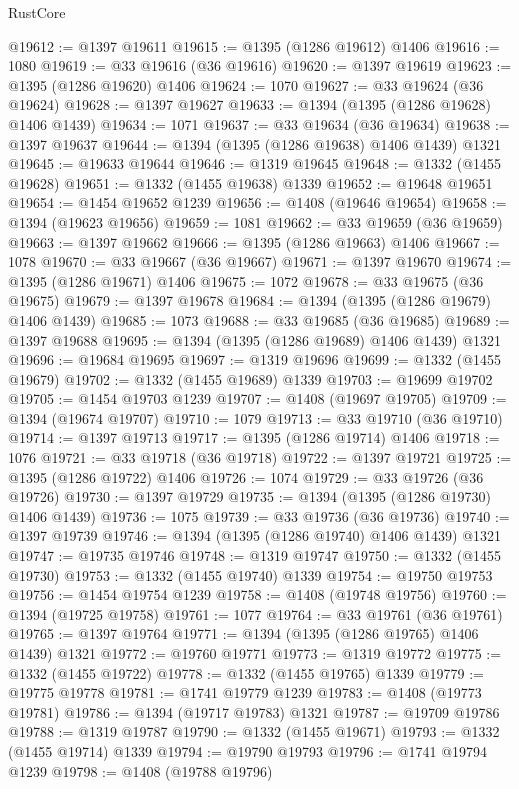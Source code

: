 \begin{lexlean}{RustCore}
\begin{coremodule}
@19612 := @1397 @19611
@19615 := @1395 (@1286 @19612) @1406
@19616 := 1080
@19619 := @33 @19616 (@36 @19616)
@19620 := @1397 @19619
@19623 := @1395 (@1286 @19620) @1406
@19624 := 1070
@19627 := @33 @19624 (@36 @19624)
@19628 := @1397 @19627
@19633 := @1394 (@1395 (@1286 @19628) @1406 @1439)
@19634 := 1071
@19637 := @33 @19634 (@36 @19634)
@19638 := @1397 @19637
@19644 := @1394 (@1395 (@1286 @19638) @1406 @1439) @1321
@19645 := @19633 @19644
@19646 := @1319 @19645
@19648 := @1332 (@1455 @19628)
@19651 := @1332 (@1455 @19638) @1339
@19652 := @19648 @19651
@19654 := @1454 @19652 @1239
@19656 := @1408 (@19646 @19654)
@19658 := @1394 (@19623 @19656)
@19659 := 1081
@19662 := @33 @19659 (@36 @19659)
@19663 := @1397 @19662
@19666 := @1395 (@1286 @19663) @1406
@19667 := 1078
@19670 := @33 @19667 (@36 @19667)
@19671 := @1397 @19670
@19674 := @1395 (@1286 @19671) @1406
@19675 := 1072
@19678 := @33 @19675 (@36 @19675)
@19679 := @1397 @19678
@19684 := @1394 (@1395 (@1286 @19679) @1406 @1439)
@19685 := 1073
@19688 := @33 @19685 (@36 @19685)
@19689 := @1397 @19688
@19695 := @1394 (@1395 (@1286 @19689) @1406 @1439) @1321
@19696 := @19684 @19695
@19697 := @1319 @19696
@19699 := @1332 (@1455 @19679)
@19702 := @1332 (@1455 @19689) @1339
@19703 := @19699 @19702
@19705 := @1454 @19703 @1239
@19707 := @1408 (@19697 @19705)
@19709 := @1394 (@19674 @19707)
@19710 := 1079
@19713 := @33 @19710 (@36 @19710)
@19714 := @1397 @19713
@19717 := @1395 (@1286 @19714) @1406
@19718 := 1076
@19721 := @33 @19718 (@36 @19718)
@19722 := @1397 @19721
@19725 := @1395 (@1286 @19722) @1406
@19726 := 1074
@19729 := @33 @19726 (@36 @19726)
@19730 := @1397 @19729
@19735 := @1394 (@1395 (@1286 @19730) @1406 @1439)
@19736 := 1075
@19739 := @33 @19736 (@36 @19736)
@19740 := @1397 @19739
@19746 := @1394 (@1395 (@1286 @19740) @1406 @1439) @1321
@19747 := @19735 @19746
@19748 := @1319 @19747
@19750 := @1332 (@1455 @19730)
@19753 := @1332 (@1455 @19740) @1339
@19754 := @19750 @19753
@19756 := @1454 @19754 @1239
@19758 := @1408 (@19748 @19756)
@19760 := @1394 (@19725 @19758)
@19761 := 1077
@19764 := @33 @19761 (@36 @19761)
@19765 := @1397 @19764
@19771 := @1394 (@1395 (@1286 @19765) @1406 @1439) @1321
@19772 := @19760 @19771
@19773 := @1319 @19772
@19775 := @1332 (@1455 @19722)
@19778 := @1332 (@1455 @19765) @1339
@19779 := @19775 @19778
@19781 := @1741 @19779 @1239
@19783 := @1408 (@19773 @19781)
@19786 := @1394 (@19717 @19783) @1321
@19787 := @19709 @19786
@19788 := @1319 @19787
@19790 := @1332 (@1455 @19671)
@19793 := @1332 (@1455 @19714) @1339
@19794 := @19790 @19793
@19796 := @1741 @19794 @1239
@19798 := @1408 (@19788 @19796)

\end{coremodule}
\end{lexlean}
